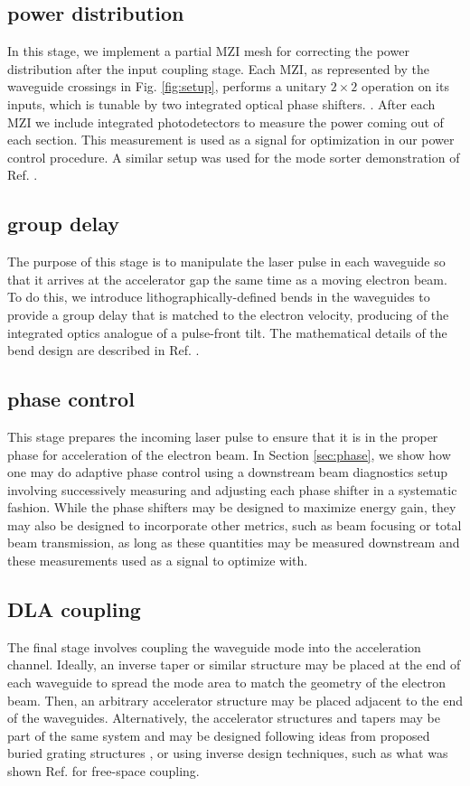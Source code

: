 \documentclass[%
 reprint,
 amsmath,amssymb,
 aps,
prstab,
floatfix,
]{revtex4-1}
\begin{document}
\subsection{power distribution}
In this stage, we implement a partial MZI mesh for correcting the power distribution after the input coupling stage.  Each MZI, as represented by the waveguide crossings in Fig. \ref{fig:setup}, performs a unitary $2\times2$ operation on its inputs, which is tunable by two integrated optical phase shifters.  \cite{reck_experimental_1994,clements_optimal_2016,shen_deep_2017}.  After each MZI we include integrated photodetectors to measure the power coming out of each section.  This measurement is used as a signal for optimization in our power control procedure.  A similar setup was used for the mode sorter demonstration of Ref. \cite{annoni_unscrambling_2017}.

\subsection{group delay}
The purpose of this stage is to manipulate the laser pulse in each waveguide so that it arrives at the accelerator gap the same time as a moving electron beam. To do this, we introduce lithographically-defined bends in the waveguides to provide a group delay that is matched to the electron velocity, producing of the integrated optics analogue of a pulse-front tilt.  The mathematical details of the bend design are described in Ref. \cite{hughes_-chip_2017}.

\subsection{phase control}
This stage prepares the incoming laser pulse to ensure that it is in the proper phase for acceleration of the electron beam.  In Section \ref{sec:phase}, we show how one may do adaptive phase control using a downstream beam diagnostics setup involving successively measuring and adjusting each phase shifter in a systematic fashion.  While the phase shifters may be designed to maximize energy gain, they may also be designed to incorporate other metrics, such as beam focusing or total beam transmission, as long as these quantities may be measured downstream and these measurements used as a signal to optimize with.

\subsection{DLA coupling}
The final stage involves coupling the waveguide mode into the acceleration channel.  Ideally, an inverse taper or similar structure may be placed at the end of each waveguide to spread the mode area to match the geometry of the electron beam.  Then, an arbitrary accelerator structure may be placed adjacent to the end of the waveguides.  Alternatively, the accelerator structures and tapers may be part of the same system and may be designed following ideas from proposed buried grating structures \cite{chang_silicon_2014}, or using inverse design techniques, such as what was shown Ref. \cite{hughes_method_2017} for free-space coupling.
\end{document}
